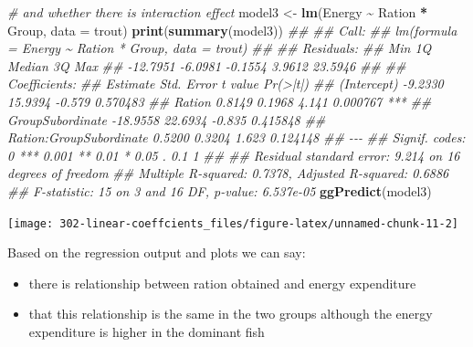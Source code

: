\documentclass[
]{book}
\newenvironment{Shaded}{\begin{snugshade}}{\end{snugshade}}
\newcommand{\CommentTok}[1]{\textcolor[rgb]{0.56,0.35,0.01}{\textit{#1}}}
\newcommand{\DataTypeTok}[1]{\textcolor[rgb]{0.13,0.29,0.53}{#1}}
\newcommand{\KeywordTok}[1]{\textcolor[rgb]{0.13,0.29,0.53}{\textbf{#1}}}
\newcommand{\NormalTok}[1]{#1}
\newcommand{\OperatorTok}[1]{\textcolor[rgb]{0.81,0.36,0.00}{\textbf{#1}}}
\newcommand{\StringTok}[1]{\textcolor[rgb]{0.31,0.60,0.02}{#1}}
\providecommand{\tightlist}{%
  \setlength{\itemsep}{0pt}\setlength{\parskip}{0pt}}
\theoremstyle{definition}
\theoremstyle{definition}
\theoremstyle{definition}
\theoremstyle{remark}
\begin{document}
\begin{Shaded}
\begin{Highlighting}[]

\CommentTok{\# and whether there is interaction effect}
\NormalTok{model3 \textless{}{-}}\StringTok{ }\KeywordTok{lm}\NormalTok{(Energy }\OperatorTok{\textasciitilde{}}\StringTok{ }\NormalTok{Ration }\OperatorTok{*}\StringTok{ }\NormalTok{Group, }\DataTypeTok{data =}\NormalTok{ trout)}
\KeywordTok{print}\NormalTok{(}\KeywordTok{summary}\NormalTok{(model3))}
\CommentTok{\#\# }
\CommentTok{\#\# Call:}
\CommentTok{\#\# lm(formula = Energy \textasciitilde{} Ration * Group, data = trout)}
\CommentTok{\#\# }
\CommentTok{\#\# Residuals:}
\CommentTok{\#\#      Min       1Q   Median       3Q      Max }
\CommentTok{\#\# {-}12.7951  {-}6.0981  {-}0.1554   3.9612  23.5946 }
\CommentTok{\#\# }
\CommentTok{\#\# Coefficients:}
\CommentTok{\#\#                         Estimate Std. Error t value Pr(\textgreater{}|t|)    }
\CommentTok{\#\# (Intercept)              {-}9.2330    15.9394  {-}0.579 0.570483    }
\CommentTok{\#\# Ration                    0.8149     0.1968   4.141 0.000767 ***}
\CommentTok{\#\# GroupSubordinate        {-}18.9558    22.6934  {-}0.835 0.415848    }
\CommentTok{\#\# Ration:GroupSubordinate   0.5200     0.3204   1.623 0.124148    }
\CommentTok{\#\# {-}{-}{-}}
\CommentTok{\#\# Signif. codes:  0 \textquotesingle{}***\textquotesingle{} 0.001 \textquotesingle{}**\textquotesingle{} 0.01 \textquotesingle{}*\textquotesingle{} 0.05 \textquotesingle{}.\textquotesingle{} 0.1 \textquotesingle{} \textquotesingle{} 1}
\CommentTok{\#\# }
\CommentTok{\#\# Residual standard error: 9.214 on 16 degrees of freedom}
\CommentTok{\#\# Multiple R{-}squared:  0.7378,	Adjusted R{-}squared:  0.6886 }
\CommentTok{\#\# F{-}statistic:    15 on 3 and 16 DF,  p{-}value: 6.537e{-}05}
\KeywordTok{ggPredict}\NormalTok{(model3)}
\end{Highlighting}
\end{Shaded}

\begin{center}\texttt{[image: 302-linear-coeffcients\_files/figure-latex/unnamed-chunk-11-2]} \end{center}

Based on the regression output and plots we can say:

\begin{itemize}
\tightlist
\item
  there is relationship between ration obtained and energy expenditure
\item
  that this relationship is the same in the two groups although the energy expenditure is higher in the dominant fish
\end{itemize}
\end{document}
